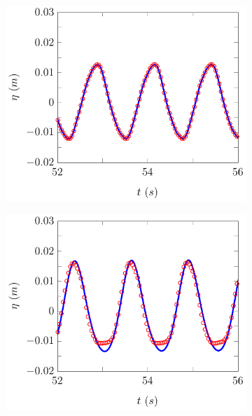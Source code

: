 \begin{figure}
	\centering
	\begin{subfigure}{0.5\textwidth}
		\includegraphics[width=\textwidth]{./chp6/figures/Experiment/Beji/sh/FDVMWG1.pdf}
		\vspace{0.5cm}
	\end{subfigure}%
	\begin{subfigure}{0.5\textwidth}
		\includegraphics[width=\textwidth]{./chp6/figures/Experiment/Beji/sh/FDVMWG2.pdf}
		\vspace{0.5cm}

\end{subfigure}
\end{figure}
